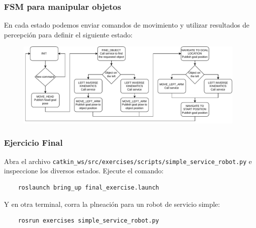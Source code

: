 \begin{frame}\frametitle{FSM para manipular objetos}
  En cada estado podemos enviar comandos de movimiento y utilizar resultados de percepción para definir el siguiente estado:
  \begin{figure}
    \centering
    \includegraphics[width=\textwidth]{Figures/FSM.pdf}
  \end{figure}
\end{frame}

\begin{frame}[containsverbatim]\frametitle{Ejercicio Final}
  Abra el archivo \texttt{catkin\_ws/src/exercises/scripts/simple\_service\_robot.py} e inspeccione los diversos estados. Ejecute el comando:
  \begin{lstlisting}
    roslaunch bring_up final_exercise.launch
  \end{lstlisting}
  Y en otra terminal, corra la plneación para un robot de servicio simple:
  \begin{lstlisting}
    rosrun exercises simple_service_robot.py
  \end{lstlisting}
\end{frame}

